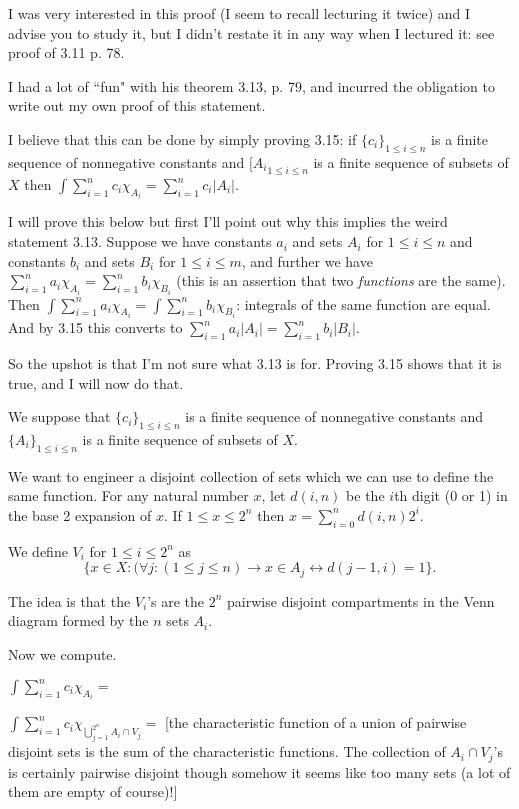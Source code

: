 \documentclass[12pt]{article}
\begin{document}
I was very interested in this proof (I seem to recall lecturing it twice) and I advise you to study it, but I didn't restate it in any way when I lectured it:  see proof of 3.11 p. 78.

I had a lot of ``fun" with his theorem 3.13, p. 79, and incurred the obligation to write out my own proof of this statement.

I believe that this can be done by simply proving 3.15:  if $\{c_i\}_{1\leq i \leq n}$ is a finite sequence of nonnegative constants and $[{A_i}_{1 \leq i \leq n}$ is a finite sequence of subsets of $X$ then $\int \sum_{i=1}^n c_i\chi_{A_i} = \sum_{i=1}^n c_i|A_i|$.

I will prove this below but first I'll point out why this implies the weird statement 3.13.  Suppose we have constants $a_i$ and sets $A_i$ for
$1 \leq i \leq n$ and constants $b_i$ and sets $B_i$ for $1 \leq i \leq m$, and further we have $\sum_{i=1}^n a_i\chi_{A_i} = \sum_{i=1}^n b_i\chi_{B_i}$ (this is an assertion that two {\em functions\/} are the same).  Then $\int \sum_{i=1}^n a_i\chi_{A_i} = \int \sum_{i=1}^n b_i\chi_{B_i}$:  integrals of the same function are equal.  And by 3.15 this converts to $\sum_{i=1}^n a_i|A_i| = \sum_{i=1}^n b_i|B_i|$.

So the upshot is that I'm not sure what 3.13 is for.  Proving 3.15 shows that it is true, and I will now do that.

We suppose that $\{c_i\}_{1\leq i \leq n}$ is a finite sequence of nonnegative constants and $\{A_i\}_{1 \leq i \leq n}$ is a finite sequence of subsets of $X$.

We want to engineer a disjoint collection of sets which we can use to define the same function.  For any natural number $x$, let $d(i,n)$ be the
$i$th digit (0 or 1) in the base 2 expansion of $x$.  If $1 \leq x \leq 2^n$ then $x = \sum_{i=0}^n d(i,n)2^i$.

We define $V_i$ for $1 \leq i \leq 2^n$ as $$\{x \in X:(\forall j:(1 \leq j \leq n) \rightarrow x \in A_j \leftrightarrow d(j-1,i)=1\}.$$

The idea is that the $V_i$'s are the $2^n$ pairwise disjoint compartments in the Venn diagram formed by the $n$ sets $A_i$.

Now we compute.

$\int  \sum_{i=1}^nc_i\chi_{A_i} =$

$\int \sum_{i=1}^n c_i\chi_{\bigcup_{j=1}^{2^n} A_i \cap V_j} =$  [the characteristic function of a union of pairwise disjoint sets is the sum of the characteristic functions.  The collection of $A_i \cap V_j$'s is certainly pairwise disjoint though somehow it seems like too many sets (a lot of them are empty of course)!]
\end{document}
